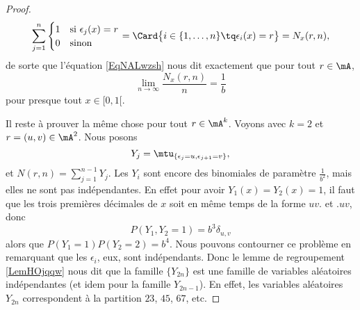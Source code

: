 \begin{proof}
    \begin{equation}
        \sum_{j=1}^n\begin{cases}
            1    &   \text{si \( \epsilon_j(x)=r\)}\\
            0    &    \text{sinon}
        \end{cases}
        =
        \Card\big\{  i\in\{ 1,\ldots, n \}\tq \epsilon_i(x)=r \big\}=N_x(r,n),
    \end{equation}
    de sorte que l'équation \eqref{EqNALwzsh} nous dit exactement que pour tout \( r\in \mA\),
    \begin{equation}
        \lim_{n\to \infty} \frac{ N_x(r,n) }{ n }=\frac{1}{ b }
    \end{equation}
    pour presque tout \( x\in\mathopen[ 0 , 1 [\).

    Il reste à prouver la même chose pour tout \( r\in\mA^k\). Voyons avec \( k=2\) et \( r=(u,v)\in\mA^2\). Nous posons
    \begin{equation}
        Y_j=\mtu_{\{ \epsilon_j=u,\epsilon_{j+1}=v \}},
    \end{equation}
    et \( N(r,n)=\sum_{j=1}^{n-1}Y_j\). Les \( Y_i\) sont encore des binomiales de paramètre \( \frac{1}{ b^2 }\), mais elles ne sont pas indépendantes. En effet pour avoir \( Y_1(x)=Y_2(x)=1\), il faut que les trois premières décimales de \( x\) soit en même temps de la forme \( uv.\) et \( .uv\), donc
    \begin{equation}
        P(Y_1,Y_2=1)=b^3\delta_{u,v}
    \end{equation}
    alors que \( P(Y_1=1)P(Y_2=2)=b^4\). Nous pouvons contourner ce problème en remarquant que les \( \epsilon_i\), eux, sont indépendants. Donc le lemme de regroupement \ref{LemHOjqqw} nous dit que la famille \( \{ Y_{2n} \} \) est une famille de variables aléatoires indépendantes (et idem pour la famille \( Y_{2n-1}\)). En effet, les variables aléatoires \( Y_{2n}\) correspondent à la partition \( 23\), \( 45\), \( 67\), etc.


\end{proof}

